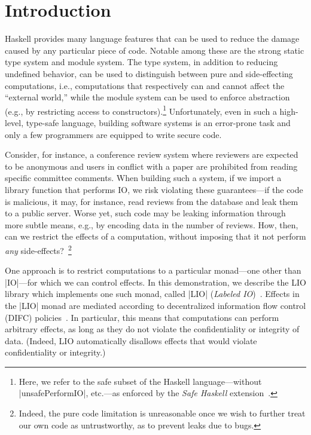 \section{Introduction}
\label{sec:intro}

Haskell provides many language features that can be used to reduce the
damage caused by any particular piece of code.
%
Notable among these are the strong static type system and module
system.
%
The type system, in addition to reducing undefined behavior, can be
used to distinguish between pure and side-effecting computations,
i.e., computations that respectively can and cannot affect the
``external world,'' while the module system can be used to enforce
abstraction (e.g., by restricting access to constructors).\footnote{
  Here, we refer to the safe subset of the Haskell language---without
  \hs|unsafePerformIO|, etc.---as enforced by
  the \emph{Safe Haskell} extension~\cite{safehaskell}.
}
%
Unfortunately, even in such a high-level, type-safe language, building
software systems is an error-prone task and only a few programmers are
equipped to write secure code.
 
Consider, for instance, a conference review system where reviewers are
expected to be anonymous and users in conflict with a paper are
prohibited from reading specific committee comments.
%
When building such a system, if we import a library function that
performs IO, we risk violating these guarantees---if the code is
malicious, it may, for instance, read reviews from the database and
leak them to a public server.
%
Worse yet, such code may be leaking information through more subtle
means, e.g., by encoding data in the number of reviews.
%
How, then, can we restrict the effects of a computation, without
imposing that it not perform \emph{any} side-effects?~\footnote{
  Indeed, the pure code limitation is unreasonable once we wish to
  further treat our own code as untrustworthy, as to prevent leaks due
  to bugs.
}

One approach is to restrict computations to a particular monad---one
other than \hs|IO|---for which we can control effects.
%
In this demonstration, we describe the LIO library which implements
one such monad, called \hs|LIO| (\emph{Labeled IO})~\cite{lio,
concurrent-lio}.
%
Effects in the \hs|LIO| monad are mediated according to
decentralized information flow control (DIFC)
policies~\cite{myers:dlm, sabelfeld:language-based-iflow}.
%
In particular, this means that computations can perform arbitrary
effects, as long as they do not violate the confidentiality or
integrity of data.
%
(Indeed, LIO automatically disallows effects that would violate
confidentiality or integrity.)
